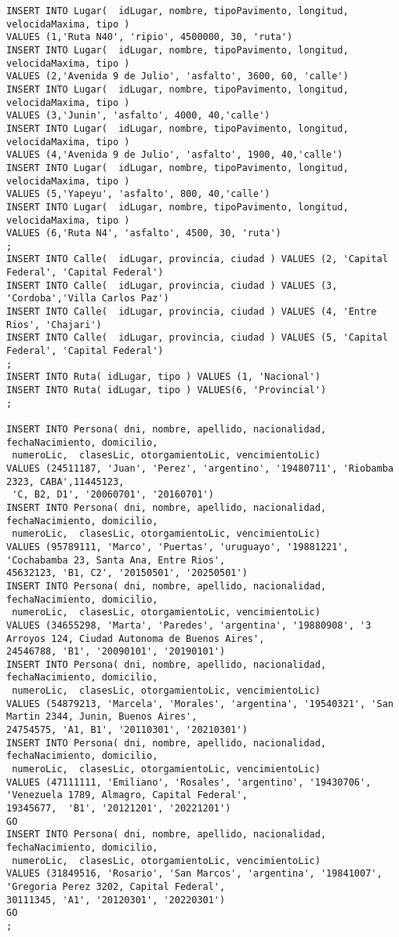 {\begin{verbatim}
INSERT INTO Lugar(  idLugar, nombre, tipoPavimento, longitud, velocidaMaxima, tipo ) 
VALUES (1,'Ruta N40', 'ripio', 4500000, 30, 'ruta')
INSERT INTO Lugar(  idLugar, nombre, tipoPavimento, longitud, velocidaMaxima, tipo ) 
VALUES (2,'Avenida 9 de Julio', 'asfalto', 3600, 60, 'calle')
INSERT INTO Lugar(  idLugar, nombre, tipoPavimento, longitud, velocidaMaxima, tipo ) 
VALUES (3,'Junin', 'asfalto', 4000, 40,'calle') 
INSERT INTO Lugar(  idLugar, nombre, tipoPavimento, longitud, velocidaMaxima, tipo ) 
VALUES (4,'Avenida 9 de Julio', 'asfalto', 1900, 40,'calle')
INSERT INTO Lugar(  idLugar, nombre, tipoPavimento, longitud, velocidaMaxima, tipo ) 
VALUES (5,'Yapeyu', 'asfalto', 800, 40,'calle')
INSERT INTO Lugar(  idLugar, nombre, tipoPavimento, longitud, velocidaMaxima, tipo ) 
VALUES (6,'Ruta N4', 'asfalto', 4500, 30, 'ruta')
;
INSERT INTO Calle(  idLugar, provincia, ciudad ) VALUES (2, 'Capital Federal', 'Capital Federal')
INSERT INTO Calle(  idLugar, provincia, ciudad ) VALUES (3, 'Cordoba','Villa Carlos Paz')
INSERT INTO Calle(  idLugar, provincia, ciudad ) VALUES (4, 'Entre Rios', 'Chajari')
INSERT INTO Calle(  idLugar, provincia, ciudad ) VALUES (5, 'Capital Federal', 'Capital Federal')
;
INSERT INTO Ruta( idLugar, tipo ) VALUES (1, 'Nacional')
INSERT INTO Ruta( idLugar, tipo ) VALUES(6, 'Provincial')
;

INSERT INTO Persona( dni, nombre, apellido, nacionalidad, fechaNacimiento, domicilio,
 numeroLic,  clasesLic, otorgamientoLic, vencimientoLic) 
VALUES (24511187, 'Juan', 'Perez', 'argentino', '19480711', 'Riobamba 2323, CABA',11445123,
 'C, B2, D1', '20060701', '20160701')
INSERT INTO Persona( dni, nombre, apellido, nacionalidad, fechaNacimiento, domicilio,
 numeroLic,  clasesLic, otorgamientoLic, vencimientoLic) 
VALUES (95789111, 'Marco', 'Puertas', 'uruguayo', '19881221', 'Cochabamba 23, Santa Ana, Entre Rios', 
45632123, 'B1, C2', '20150501', '20250501')
INSERT INTO Persona( dni, nombre, apellido, nacionalidad, fechaNacimiento, domicilio,
 numeroLic,  clasesLic, otorgamientoLic, vencimientoLic) 
VALUES (34655298, 'Marta', 'Paredes', 'argentina', '19880908', '3 Arroyos 124, Ciudad Autonoma de Buenos Aires', 
24546788, 'B1', '20090101', '20190101')
INSERT INTO Persona( dni, nombre, apellido, nacionalidad, fechaNacimiento, domicilio,
 numeroLic,  clasesLic, otorgamientoLic, vencimientoLic) 
VALUES (54879213, 'Marcela', 'Morales', 'argentina', '19540321', 'San Martin 2344, Junin, Buenos Aires', 
24754575, 'A1, B1', '20110301', '20210301')
INSERT INTO Persona( dni, nombre, apellido, nacionalidad, fechaNacimiento, domicilio,
 numeroLic,  clasesLic, otorgamientoLic, vencimientoLic) 
VALUES (47111111, 'Emiliano', 'Rosales', 'argentino', '19430706', 'Venezuela 1789, Almagro, Capital Federal', 
19345677,  'B1', '20121201', '20221201')
GO
INSERT INTO Persona( dni, nombre, apellido, nacionalidad, fechaNacimiento, domicilio,
 numeroLic,  clasesLic, otorgamientoLic, vencimientoLic) 
VALUES (31849516, 'Rosario', 'San Marcos', 'argentina', '19841007', 'Gregoria Perez 3202, Capital Federal', 
30111345, 'A1', '20120301', '20220301')
GO
;


\end{verbatim}}
